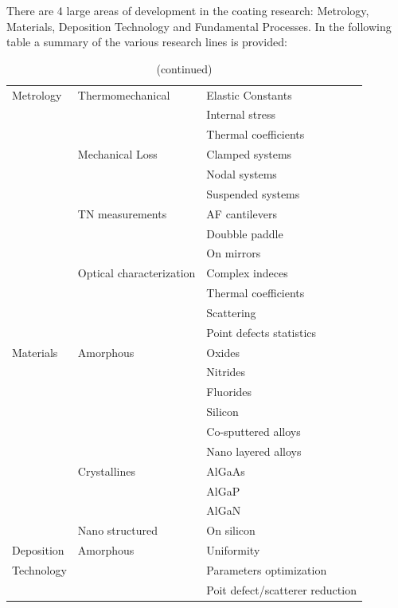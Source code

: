 There are 4 large areas of development in the coating research: Metrology, Materials, Deposition Technology and Fundamental Processes. In the following table a summary of the various research lines is provided:
%
\begin{longtable}{|p{}|p{}|p{}|}
\caption{Bla bla\label{tab:characterization}} \\
\hline\hline
\endfirsthead
\caption[]{(continued)}\\
\hline\hline
\endhead
{\sc Metrology} & Thermomechanical & Elastic Constants \\\cline{3-3}
 & & Internal stress \\\cline{3-3}
 & & Thermal coefficients \\\cline{2-3}
 & Mechanical Loss & Clamped systems \\\cline{3-3}
 & & Nodal systems \\\cline{3-3}
 & & Suspended systems \\\cline{2-3}
 & TN measurements & AF cantilevers \\\cline{3-3}
 & & Doubble paddle \\\cline{3-3}
 & & On mirrors \\\cline{2-3}
 & Optical characterization & Complex indeces \\\cline{3-3}
 & & Thermal coefficients \\\cline{3-3}
 & & Scattering \\\cline{3-3}
 & & Point defects statistics\\\hline\hline 
{\sc Materials} & Amorphous & Oxides \\\cline{3-3}
 & & Nitrides \\\cline{3-3}
 & & Fluorides \\\cline{3-3}
 & & Silicon \\\cline{3-3}
 & & Co-sputtered alloys \\\cline{3-3}
 & & Nano layered alloys \\\cline{2-3}
 & Crystallines & AlGaAs \\\cline{3-3}
 & & AlGaP \\\cline{3-3}
 & & AlGaN \\\cline{2-3}
 & Nano structured & On silicon \\\hline\hline
{\sc Deposition} & Amorphous & Uniformity \\\cline{3-3}
{\sc Technology} & & Parameters optimization \\\cline{3-3}
 & & Poit defect/scatterer reduction \\\cline{3-3}

\end{longtable}
